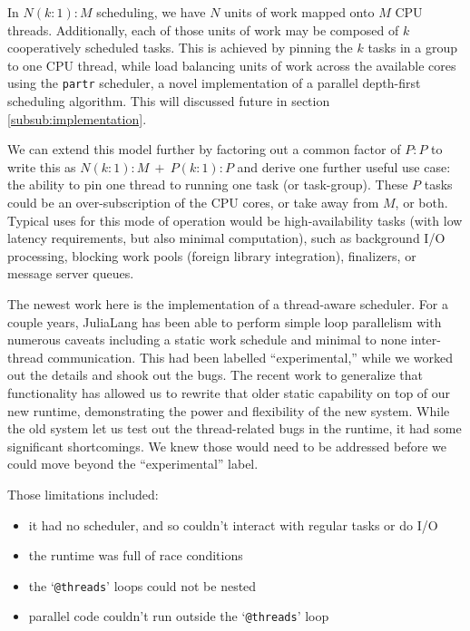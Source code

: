 \documentclass{juliacon}
\begin{document}
In $N (k \mathbin{:} 1) \mathbin{:} M$ scheduling, we have $N$ units of work mapped onto $M$ CPU threads. Additionally, each of those units of work may be composed of $k$ cooperatively scheduled tasks. This is achieved by pinning the $k$ tasks in a group to one CPU thread, while load balancing units of work across the available cores using the \verb|partr| scheduler, a novel implementation of a parallel depth-first scheduling algorithm. This will discussed future in section \ref{subsub:implementation}.

We can extend this model further by factoring out a common factor of $P \mathbin{:} P$ to write this as $N (k \mathbin{:} 1) \mathbin{:} M\ +\ P(k \mathbin{:} 1) \mathbin{:} P$ and derive one further useful use case: the ability to pin one thread to running one task (or task-group). These $P$ tasks could be an over-subscription of the CPU cores, or take away from $M$, or both. Typical uses for this mode of operation would be high-availability tasks (with low latency requirements, but also minimal computation), such as background I/O processing, blocking work pools (foreign library integration), finalizers, or message server queues.

The newest work here is the implementation of a thread-aware scheduler. For a couple years, JuliaLang has been able to perform simple loop parallelism with numerous caveats including a static work schedule and minimal to none inter-thread communication. This had been labelled ``experimental,'' while we worked out the details and shook out the bugs. The recent work to generalize that functionality has allowed us to rewrite that older static capability on top of our new runtime, demonstrating the power and flexibility of the new system. While the old system let us test out the thread-related bugs in the runtime, it had some significant shortcomings. We knew those would need to be addressed before we could move beyond the ``experimental'' label.

Those limitations included:
\begin{itemize}
\item it had no scheduler, and so couldn't interact with regular tasks or do I/O
\item the runtime was full of race conditions
\item the `\verb|@threads|' loops could not be nested
\item parallel code couldn't run outside the `\verb|@threads|' loop
\end{itemize}
\end{document}
